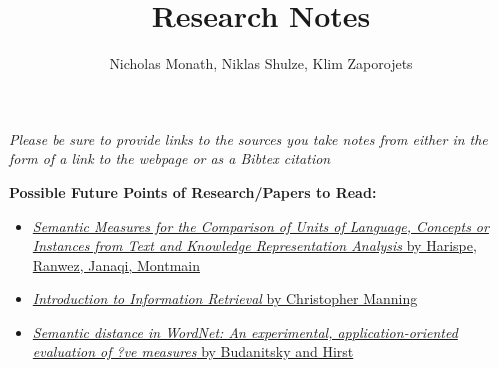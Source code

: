 \documentclass[12pt]{article}
\newcommand{\bt}[1]{\textbf{#1}}
\begin{document}
  \title{Research Notes}
  \author{Nicholas Monath, Niklas Shulze, Klim Zaporojets}
\maketitle  

\begin{framed}
\emph{Please be sure to provide links to the sources you take notes from either in the form of a link to the webpage or as a Bibtex citation}
\end{framed}

\begin{framed}
\centering
\bt{Possible Future Points of Research/Papers to Read:}
\begin{itemize}
\item \href{http://arxiv.org/pdf/1310.1285v2.pdf}{\emph{Semantic Measures for the Comparison of Units of Language, Concepts or Instances from Text and Knowledge Representation Analysis} by Harispe, Ranwez, Janaqi, Montmain}
\item \href{http://www-nlp.stanford.edu/IR-book/}{\emph{Introduction to Information Retrieval} by Christopher Manning}
\item \href{ftp://learning.cs.utoronto.ca/pub/gh/Budanitsky+Hirst-2001.pdf}{\emph{Semantic distance in WordNet:
An experimental, application-oriented evaluation of ?ve measures} by Budanitsky and Hirst}
\end{itemize}
\end{framed}

\clearpage
\end{document}
